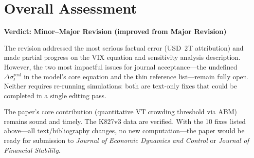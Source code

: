 \documentclass[12pt,a4paper]{article}
\begin{document}
\section*{Overall Assessment}

\textbf{Verdict: Minor--Major Revision (improved from Major Revision)}

The revision addressed the most serious factual error (USD~2T attribution) and made partial progress on the VIX equation and sensitivity analysis description. However, the two most impactful issues for journal acceptance---the undefined $\Delta\sigma^{\text{real}}_t$ in the model's core equation and the thin reference list---remain fully open. Neither requires re-running simulations: both are text-only fixes that could be completed in a single editing pass.

The paper's core contribution (quantitative VT crowding threshold via ABM) remains sound and timely. The K827v3 data are verified. With the 10 fixes listed above---all text/bibliography changes, no new computation---the paper would be ready for submission to \emph{Journal of Economic Dynamics and Control} or \emph{Journal of Financial Stability}.
\end{document}
